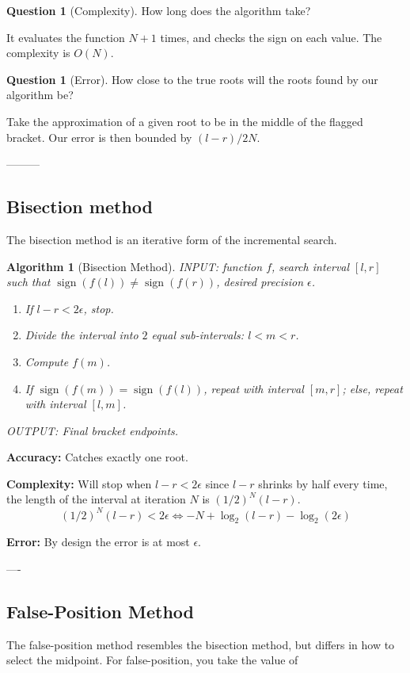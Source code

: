 \documentclass[12pt]{amsart}
\DeclareMathOperator{\sign}{sign}
\newtheorem{alg}[thm]{Algorithm}   %
\theoremstyle{definition}
\newtheorem{question}[thm]{Question}
\begin{document}
\begin{question}[Complexity]
How long does the algorithm take?
\end{question}
It evaluates the function $N+1$ times, and checks the sign on
each value. The complexity is $O(N)$.

\begin{question}[Error]
How close to the true roots will the roots
found by our algorithm be?
\end{question}
Take the approximation of a given root to be in the
middle of the flagged bracket. 
Our error is then bounded by $(l-r)/2N$.


---------

\subsection{Bisection method}

The bisection method is an iterative form of the
incremental search.

\begin{alg}[Bisection Method] INPUT: function $f$, 
search interval $[l,r]$ such that $\sign(f(l)) \neq \sign(f(r))$,
desired precision $\epsilon$.
\begin{enumerate}
\item If $l-r < 2\epsilon$, stop.
\item Divide the interval into $2$ equal sub-intervals: $l < m < r$.
\item Compute $f(m)$.
\item If $\sign(f(m)) = \sign(f(l))$, repeat with interval $[m,r]$;
else, repeat with interval $[l,m]$.
\end{enumerate}
OUTPUT: Final bracket endpoints.

\end{alg}

{\bf Accuracy:} Catches exactly one root.

{\bf Complexity:} Will stop when $l-r < 2\epsilon$ since $l-r$ shrinks
by half every time, the length of the interval at iteration $N$ is 
$(1/2)^N (l-r)$.
\[
(1/2)^N (l-r) < 2 \epsilon \iff -N +  \log_2(l-r)-\log_2(2\epsilon) 
\]

{\bf Error:} By design the error is at most $\epsilon$.


----

\subsection{False-Position Method}

The false-position method resembles the bisection method,
but differs in how to select the midpoint. 
For false-position, you take the value of 
\end{document}
